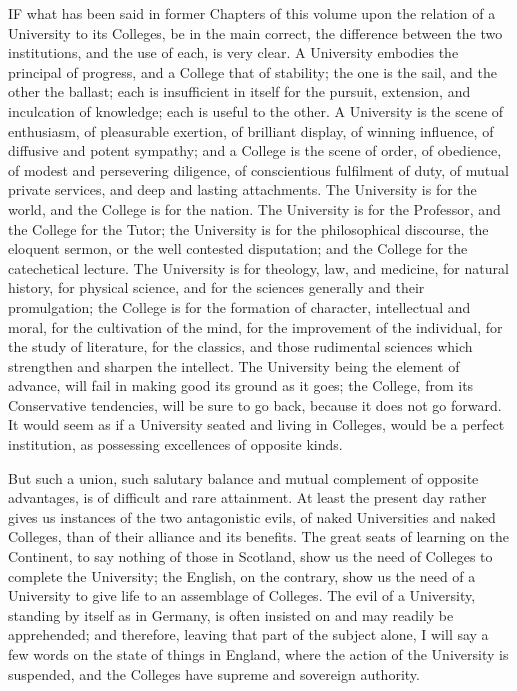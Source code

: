 IF
what has been said in former Chapters of this volume upon the relation
of a University to its Colleges, be in the main correct, the
difference between the two institutions, and the use of each, is very
clear. A University embodies the principal of progress, and a College
that of stability; the one is the sail, and the other the ballast;
each is insufficient in itself for the pursuit, extension, and
inculcation of knowledge; each is useful to the other. A University is
the scene of enthusiasm, of pleasurable exertion, of brilliant
display, of winning influence, of diffusive and potent sympathy; and a
College is the scene of order, of obedience, of modest and persevering
diligence, of conscientious fulfilment of duty, of mutual private
services, and deep and lasting attachments. The University is for the
world, and the College is for the nation. The University is for the
Professor, and the College for the Tutor; the University is for the
philosophical discourse, the eloquent sermon, or the well contested
disputation; and the College for the catechetical lecture. The
University is for theology, law, and medicine, for natural history,
for physical science, and for the sciences generally and their
promulgation; the College is for the formation of character,
intellectual and moral, for the cultivation of the mind, for the
improvement of the individual, for the study of literature, for the
classics, and those rudimental sciences which strengthen and sharpen
the intellect. The University being the element of advance, will fail
in making good its ground as it goes; the College, from its
Conservative tendencies, will be sure to go back, because it does not
go forward. It would seem as if a University seated and living in
Colleges, would be a perfect institution, as possessing excellences of
opposite kinds.

But such a union, such
salutary balance and mutual complement of opposite advantages, is of
difficult and rare attainment. At least the present day rather gives
us instances of the two antagonistic evils, of naked Universities and
naked Colleges, than of their alliance and its benefits. The great
seats of learning on the Continent, to say nothing of those in
Scotland, show us the need of Colleges to complete the University; the
English, on the contrary, show us the need of a University to give
life to an assemblage of Colleges. The evil of a University, standing
by itself as in Germany, is often insisted on and may readily be
apprehended; and therefore, leaving that part of the subject alone, I
will say a few words on the state of things in England, where the
action of the University is suspended, and the Colleges have supreme
and sovereign authority.


